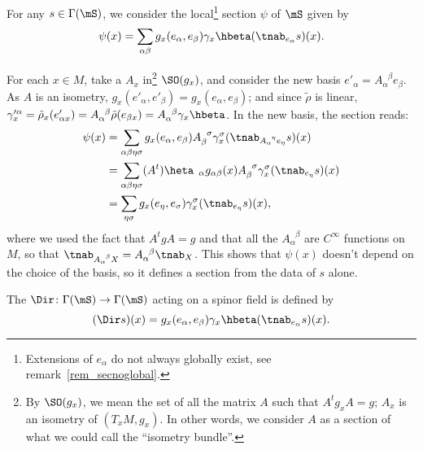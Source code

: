 For any $s\in\Gamma(\mS)$, we consider the local\footnote{Extensions of $e_{\alpha}$ do not always globally exist, see remark~\ref{rem_secnoglobal}.} section $\psi$ of $\mS$ given by
\[
    \psi(x)=
   \sum_{\alpha\beta}g_x(e_{\alpha},e_{\beta})\gamma_x\hbeta(\tnab_{e_{\alpha}}s)(x).
\]

For each $x\in M$, take a $A_x$ in\footnote{By $\SO(g_x)$, we mean the set of all the matrix $A$ such that $A^tg_xA=g$; $A_x$ is an isometry of $(T_xM,g_x)$. In other words, we consider $A$ as a section of what we could call the ``isometry bundle''.} $\SO(g_x)$, and consider the new basis $e'_{\alpha}=A_{\alpha}^{\phantom{\alpha}\beta}e_{\beta}$. As $A$ is an isometry, $g_x(e'_{\alpha},e'_{\beta})=g_x(e_{\alpha},e_{\beta})$; and since $\tilde\rho$ is linear, $\gamma_x'^{\alpha}=\tilde\rho_x(e'_{\alpha x})=A_{\alpha}^{\phantom{\alpha}\beta}\tilde\rho(e_{\beta x})=A_{\alpha}^{\phantom{\alpha}\beta}\gamma_x\hbeta$. In the new basis, the section reads:
\begin{equation}
\begin{split}
   \psi(x)&=\sum_{\alpha\beta\eta\sigma}g_x(e_{\alpha},e_{\beta})
                A_{\beta}^{\phantom{\beta}\sigma}\gamma_x^{\sigma}
                (\tnab_{A_{\alpha}^{\phantom{\alpha}\eta}e_{\eta}}s)(x)\\
          &=\sum_{\alpha\beta\eta\sigma}(A^t)\heta_{\phantom{\eta}\alpha}
                  g_{\alpha\beta}(x)A_{\beta}^{\phantom{\beta}\sigma}
                  \gamma_x^{\sigma}(\tnab_{e_{\eta}}s)(x)\\
          &=\sum_{\eta\sigma}g_x(e_{\eta},e_{\sigma})\gamma_x^{\sigma}(\tnab_{e_{\eta}}s)(x),
\end{split}
\end{equation}
where we used the fact that $A^tgA=g$ and that all the $A_{\alpha}^{\phantom{\alpha}\beta}$ are $C^{\infty}$ functions on $M$, so that
$\tnab_{A_{\alpha}^{\phantom{\alpha}\beta}X}=A_{\alpha}^{\phantom{\alpha}\beta}\tnab_X$.  This shows that $\psi(x)$ doesn't depend on the choice of the basis, so it defines a section from the data of $s$ alone.


The  $\Dir\colon \Gamma(\mS)\to \Gamma(\mS)$ acting on a spinor field is defined by
\begin{equation}\label{dirac}
(\Dir s)(x)=g_x(e_{\alpha},e_{\beta})\gamma_x\hbeta(\tnab_{e_{\alpha}}s)(x).
\end{equation}


